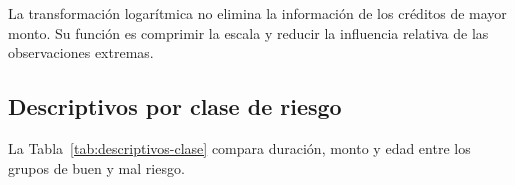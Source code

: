 La transformación logarítmica no elimina la información de los créditos
de mayor monto. Su función es comprimir la escala y reducir la influencia
relativa de las observaciones extremas.

\subsection{Descriptivos por clase de riesgo}

La Tabla~\ref{tab:descriptivos-clase} compara duración, monto y edad
entre los grupos de buen y mal riesgo.

\begin{table}[H]
    \centering
    \caption{Estadística descriptiva de las variables principales según
    la clase de riesgo.}
    \label{tab:descriptivos-clase}

    \footnotesize
\end{table}
